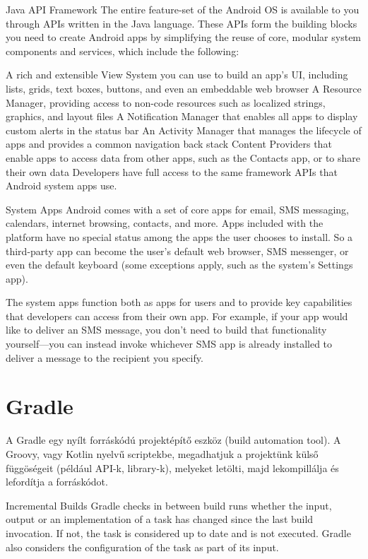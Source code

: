 Java API Framework
The entire feature-set of the Android OS is available to you through APIs written in the Java language. These APIs form the building blocks you need to create Android apps by simplifying the reuse of core, modular system components and services, which include the following:

A rich and extensible View System you can use to build an app’s UI, including lists, grids, text boxes, buttons, and even an embeddable web browser
A Resource Manager, providing access to non-code resources such as localized strings, graphics, and layout files
A Notification Manager that enables all apps to display custom alerts in the status bar
An Activity Manager that manages the lifecycle of apps and provides a common navigation back stack
Content Providers that enable apps to access data from other apps, such as the Contacts app, or to share their own data
Developers have full access to the same framework APIs that Android system apps use.

System Apps
Android comes with a set of core apps for email, SMS messaging, calendars, internet browsing, contacts, and more. Apps included with the platform have no special status among the apps the user chooses to install. So a third-party app can become the user's default web browser, SMS messenger, or even the default keyboard (some exceptions apply, such as the system's Settings app).

The system apps function both as apps for users and to provide key capabilities that developers can access from their own app. For example, if your app would like to deliver an SMS message, you don't need to build that functionality yourself—you can instead invoke whichever SMS app is already installed to deliver a message to the recipient you specify.

\section{Gradle}\label{sec:ALAP:adatelem}

A Gradle egy nyílt forráskódú projektépítő eszköz (build automation tool). A Groovy, vagy Kotlin nyelvű scriptekbe, megadhatjuk a projektünk külső függöségeit (például API-k, library-k), melyeket letölti, majd lekompillálja és lefordítja a forráskódot.

Incremental Builds
Gradle checks in between build runs whether the input, output or an implementation of a task has changed since the last build invocation. If not, the task is considered up to date and is not executed. Gradle also considers the configuration of the task as part of its input.

